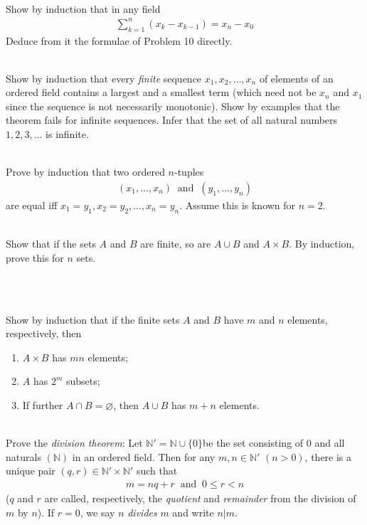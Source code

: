 \documentclass[12pt]{book}
\newcommand{\N}{\mathbb{N}}
\theoremstyle{definition}
\begin{document}
\begin{ex}[14]
\\
Show by induction that in any field
\begin{align*}
	\sum_{k=1}^{n}(x_k-x_{k-1}) =x_n -x_0
\end{align*}	
Deduce from it the formulae of Problem 10 directly.
\end{ex}
\begin{ex}[15]
\\
Show by induction that every \textit{finite} sequence $x_1, x_2, \ldots, x_n$ of elements of an ordered field contains a largest and a smallest term (which need not be $x_n$ and $x_1$ since the sequence is not necessarily monotonic). Show by examples that the theorem fails for infinite sequences. Infer that the set of all natural numbers $1,2,3, \ldots$ is infinite.
\end{ex}
\begin{ex}[16]
\\
Prove by induction that two ordered $n$-tuples
\begin{align*}
	(x_1,\ldots, x_n)\;\; \text{and} \;\; (y_1, \ldots, y_n)
\end{align*}
are equal iff $x_1 = y_1, x_2= y_2, \ldots, x_n=y_n$. Assume this is known for $n=2$. 	
\end{ex}
\begin{ex}[17]
\\
Show that if the sets $A$ and $B$ are finite, so are $A \cup B$ and $A \times B$. By induction, prove this for $n$ sets.  	
\end{ex}
\begin{ex}[18]
\\
	
\end{ex}
\begin{ex}[19]
\\
Show by induction that if the finite sets $A$ and $B$ have $m$ and $n$ elements, respectively, then
\begin{enumerate}[label = (\roman*)]
	\item $A \times B$ has $mn$ elements;
	\item $A$ has $2^m$ subsets;
	\item If further $A \cap B = \varnothing$, then $A \cup B$ has $m+n$ elements.
\end{enumerate} 	
\end{ex}
\begin{ex}[20]
\\
Prove the \textit{division theorem}: Let $\N' = \N \cup \{0\}$be the set consisting of $0$ and all naturals $(\N)$ in an ordered field. Then for any $m,n \in \N'$ $(n>0)$, there is a unique pair $(q,r) \in \N' \times \N'$ such that
\begin{align*}
	m=nq +r\;\; \text{and} \;\; 0 \leq r <n
\end{align*}
($q$ and $r$ are called, respectively, the \textit{quotient} and \textit{remainder} from the division of $m$ by $n$). If $r= 0$, we say $n$ \textit{divides} $m$ and write $n|m$.
\end{ex}
\end{document}
